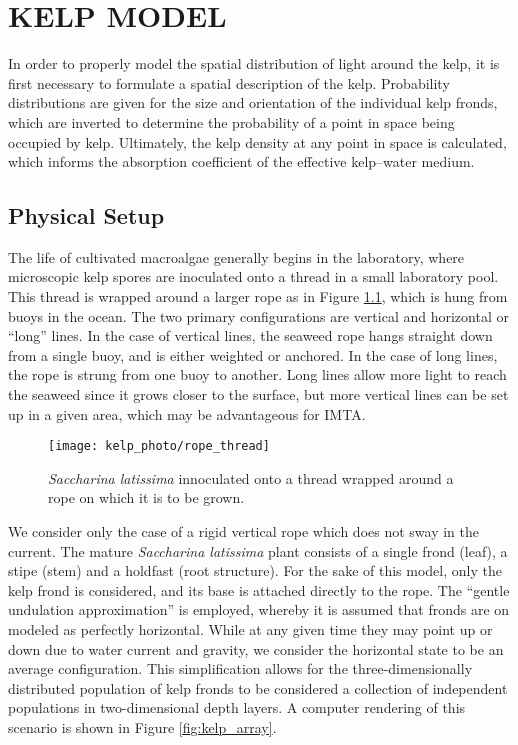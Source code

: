 \chapter{KELP MODEL}
\label{chap:kelp}

In order to properly model the spatial distribution of light around the kelp, it is first necessary to formulate a spatial description of the kelp.
Probability distributions are given for the size and orientation of the individual kelp fronds, which are inverted to determine the probability of a point in space being occupied by kelp.
Ultimately, the kelp density at any point in space is calculated, which informs the absorption coefficient of the effective kelp--water medium.


\section{Physical Setup}
The life of cultivated macroalgae generally begins in the laboratory, where microscopic kelp spores are inoculated onto a thread in a small laboratory pool.
This thread is wrapped around a larger rope as in Figure \ref{fig:rope_thread}, which is hung from buoys in the ocean.
The two primary configurations are vertical and horizontal or ``long'' lines.
In the case of vertical lines, the seaweed rope hangs straight down from a single buoy, and is either weighted or anchored.
In the case of long lines, the rope is strung from one buoy to another.
Long lines allow more light to reach the seaweed since it grows closer to the surface, but more vertical lines can be set up in a given area,
which may be advantageous for IMTA.

\begin{figure}[H]
  \centering
  \texttt{[image: kelp\_photo/rope\_thread]}
  \caption{\textit{Saccharina latissima} innoculated onto a thread wrapped around a rope on which it is to be grown.}
  \label{fig:rope_thread}
\end{figure}

We consider only the case of a rigid vertical rope which does not sway in the current.
The mature \textit{Saccharina latissima} plant consists of a single frond (leaf), a stipe (stem) and a holdfast (root structure).
For the sake of this model, only the kelp frond is considered, and its base is attached directly to the rope.
The ``gentle undulation approximation'' is employed, whereby it is assumed that fronds are on modeled as perfectly horizontal.
While at any given time they may point up or down due to water current and gravity, we consider the horizontal
state to be an average configuration.
This simplification allows for the three-dimensionally distributed population of kelp fronds
to be considered a collection of independent populations in two-dimensional depth layers.
A computer rendering of this scenario is shown in Figure \ref{fig:kelp_array}.

